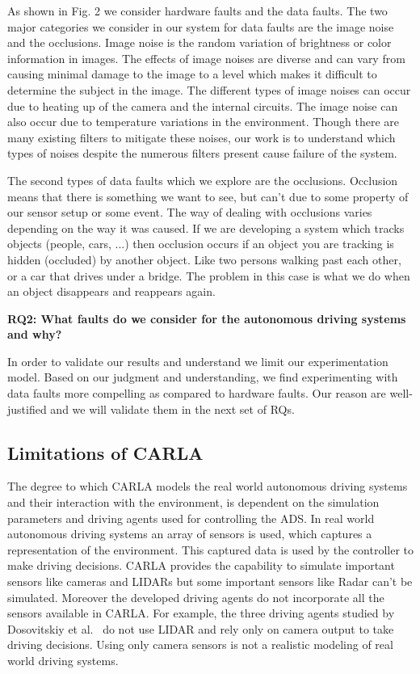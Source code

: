 As shown in Fig. 2 we consider hardware faults and the data faults. The two major categories we consider in our system for data faults are the image noise and the occlusions. Image noise is the random variation of brightness or color information in images.
The effects of image noises are diverse and can vary from causing minimal damage to the image to
a level which makes it difficult to determine the subject in the image. The different types of image noises can occur due to heating up of the camera and the internal circuits. The image noise can also occur due to temperature variations in the environment. Though there are many existing filters to mitigate these noises, our work is to understand which types of noises despite the numerous filters present cause failure of the system. 

The second types of data faults which we explore are the occlusions. Occlusion means that there is something we want to see, but can't due to some property of our sensor setup or some event. The way of dealing with occlusions varies depending on the way it was caused. If we are developing a system which tracks objects (people, cars, ...) then occlusion occurs if an object you are tracking is hidden (occluded) by another object. Like two persons walking past each other, or a car that drives under a bridge. The problem in this case is what we do when an object disappears and reappears again.

\textbf{RQ2: What faults do we consider for the autonomous driving systems and why?}

In order to validate our results and understand we limit our experimentation model. Based on our judgment and understanding, we find experimenting with data faults more compelling as compared to hardware faults. Our reason are well-justified and we will validate them in the next set of RQs.

\subsection{Limitations of CARLA}
The degree to which CARLA models the real world autonomous driving systems and their interaction with the environment, is dependent on the simulation parameters and driving agents used for controlling the ADS. In real world autonomous driving systems an array of sensors is used, which captures a representation of the environment. This captured data is used by the controller to make driving decisions. CARLA provides the capability to simulate important sensors like cameras and LIDARs but some important sensors like Radar can't be simulated. Moreover the developed driving agents do not incorporate all the sensors available in CARLA. For example, the three driving agents studied by Dosovitskiy et al.~\cite{Dosovitskiy17} do not use LIDAR and rely only on camera output to take driving decisions. Using only camera sensors is not a realistic modeling of real world driving systems. 

